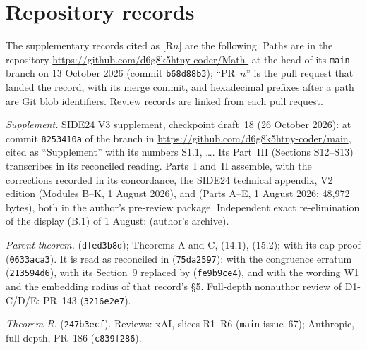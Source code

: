 \section{Repository records}\label{app:records}

The supplementary records cited as [R$n$] are the following. Paths are in the repository \url{https://github.com/d6g8k5htny-coder/Math-} at the head of its \texttt{main} branch on 13 October 2026 (commit \texttt{b68d88b3}); ``PR~$n$'' is the pull request that landed the record, with its merge commit, and hexadecimal prefixes after a path are Git blob identifiers. Review records are linked from each pull request.

{\sloppy
\begin{enumerate}[label={[R\arabic*]}, ref={R\arabic*}, leftmargin=3.2em, itemsep=2pt]\small
\item\label{rec:supp} \emph{Supplement.} SIDE24 V3 supplement, checkpoint draft~18 (26 October 2026):  at commit \texttt{8253410a} of the branch  in \url{https://github.com/d6g8k5htny-coder/main}, cited as ``Supplement'' with its numbers S1.1, \dots. Its Part~III (Sections S12--S13) transcribes  in its reconciled reading. Parts~I and~II assemble, with the corrections recorded in its concordance, the SIDE24 technical appendix, V2 edition (Modules B--K, 1 August 2026), and  (Parts A--E, 1 August 2026; 48{,}972 bytes), both in the author's pre-review package. Independent exact re-elimination of the display (B.1) of 1 August:  (author's archive).
\item\label{rec:parent} \emph{Parent theorem.}  (\texttt{dfed3b8d}); Theorems A and C, (14.1), (15.2); with its cap proof  (\texttt{0633aca3}). It is read as reconciled in  (\texttt{75da2597}): with the congruence erratum  (\texttt{213594d6}), with its Section~9 replaced by  (\texttt{fe9b9ce4}), and with the wording W1 and the embedding radius of that record's \S5. Full-depth nonauthor review of D1-C/D/E: PR~143 (\texttt{3216e2e7}).
\item\label{rec:thmR} \emph{Theorem R.}  (\texttt{247b3ecf}). Reviews: xAI, slices R1--R6 (\texttt{main} issue~67); Anthropic, full depth, PR~186 (\texttt{c839f286}).

\end{enumerate}}
